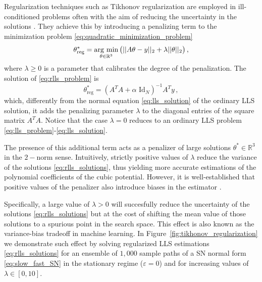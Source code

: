 \documentclass[10pt]{article}
\newcommand{\fref}[1]{Figure~\ref{#1}}
\begin{document}
% 
Regularization techniques such as Tikhonov regularization \cite{Tikhonov1963} are employed in ill-conditioned problems often with the aim of reducing the uncertainty in the solutions \cite{Cheng2011}.
They achieve this by introducing a penalizing term to the minimization problem \eqref{eq:quadratic_minimization_problem} 
\begin{equation}\label{eq:rlls_problem}
        \theta^*_{\text{reg}} = \operatorname*{\arg\,min}_{\theta\in\mathbb{R}^3}\big(||A\theta - y||_2 + \lambda||\theta||_2\big)\,,
\end{equation}
where $\lambda\geq0$ is a parameter that calibrates the degree of the penalization.
The solution of \eqref{eq:rlls_problem} is
\begin{equation}\label{eq:rlls_solutions}
        \theta^*_{\text{reg}} = (A^{T}A + \alpha\text{ Id}_N)^{-1}A^{T}y\,,
\end{equation}
which, differently from the normal equation \eqref{eq:lls_solution} of the ordinary LLS solution, it adds the penalizing parameter $\lambda$ to the diagonal entries of the square matrix $A^TA$.
Notice that the case $\lambda=0$ reduces to an ordinary LLS problem \eqref{eq:lls_problem}-\eqref{eq:lls_solution}.

The presence of this additional term acts as a penalizer of large solutions $\theta^*\in \mathbb{R}^{3}$ in the $2-$norm sense.
Intuitively, strictly positive values of $\lambda$ reduce the variance of the solutions \eqref{eq:rlls_solutions}, thus yielding more accurate estimations of the polynomial coefficients of the cubic potential.
However, it is well-established that positive values of the penalizer also introduce biases in the estimator \cite{Hoerl1970}.

Specifically, a large value of $\lambda>0$ will succesfully reduce the uncertainty of the solutions \eqref{eq:rlls_solutions} but at the cost of shifting the mean value of those solutions to a spurious point in the search space.
This effect is also known as the variance-bias tradeoff in machine learning. 
In \fref{fig:tikhonov_regularization} we demonstrate such effect by solving regularized LLS estimations \eqref{eq:rlls_solutions} for an ensemble of $1,000$ sample paths of a SN normal form \eqref{eq:slow_fast_SN} in the stationary regime ($\varepsilon=0$) and for increasing values of $\lambda\in[0,10]$.

\printbibliography
\end{document}
